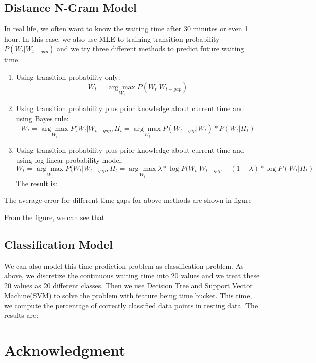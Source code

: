 \documentclass[10pt, conference, compsocconf]{IEEEtran}
\begin{document}
\subsection{Distance N-Gram Model}
In real life, we often want to know the waiting time after 30 minutes or even 1 hour. In this case, we also use MLE to training transition probability
$P(W_t|W_{t-gap})$ and we try three different methods to predict future waiting time.
\begin{enumerate}
\item Using transition probability only:
\begin{equation}
W_t=\underset{W_t}{\arg\max}{P(W_t|W_{t-gap})}
\end{equation}
\item Using transition probability plus prior knowledge about current time and using Bayes rule:
\begin{equation}
W_t=\underset{W_t}{\arg\max}{P(W_t|W_{t-gap},H_t} = \underset{W_t}{\arg\max}{P(W_{t-gap}|W_t)*P(W_t|H_t)}
\end{equation}
\item Using transition probability plus prior knowledge about current time and using log linear probability model:
\begin{equation}
W_t=\underset{W_t}{\arg\max}{P(W_t|W_{t-gap},H_t} = \underset{W_t}{\arg\max}{\lambda*\log P(W_t|W_{t-gap}+(1-\lambda)*\log P(W_t|H_t)}
\end{equation}
The result is: 


\end{enumerate}
The average error for different time gaps for above methods are shown in figure 

From the figure, we can see that 
\subsection{Classification Model}
We can also model this time prediction problem as classification problem. As above, we discretize the continuous
waiting time into 20 values and we treat these 20 values as 20 different classes. Then we use Decision Tree and
Support Vector Machine(SVM) to solve the problem with feature being time bucket.
This time, we compute the percentage of correctly classified data points in testing data. The results are:



\section*{Acknowledgment}
\end{document}
